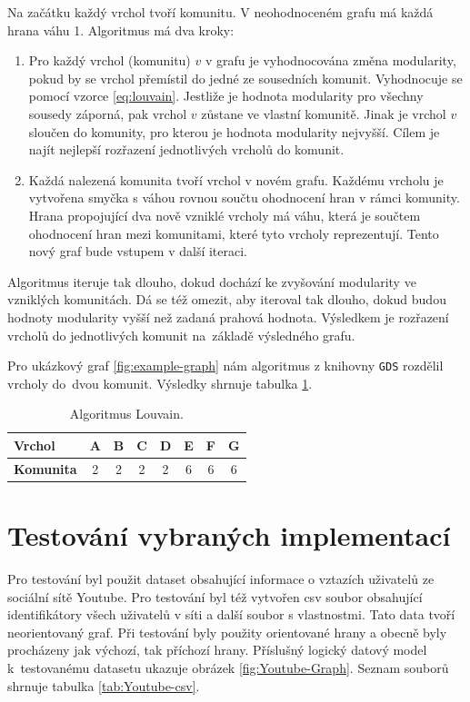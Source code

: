 \documentclass[
  program=infoi,
  biblatex=true,
  figures=true,
  glossaries=false,
  index,
  sourcecodes=true
]{kidiplom}
\begin{document}
Na začátku každý vrchol tvoří komunitu. V neohodnoceném grafu má každá hrana váhu 1. Algoritmus má dva kroky:
\begin{enumerate}
\item Pro každý vrchol (komunitu) $v$ v grafu je vyhodnocována změna modularity, pokud by se vrchol přemístil do jedné ze sousedních komunit. Vyhodnocuje se pomocí vzorce \ref{eq:louvain}. Jestliže je hodnota modularity pro všechny sousedy záporná, pak vrchol $v$ zůstane ve vlastní komunitě. Jinak je vrchol $v$ sloučen do komunity, pro kterou je hodnota modularity nejvyšší. Cílem je najít nejlepší rozřazení jednotlivých vrcholů do komunit.
\item Každá nalezená komunita tvoří vrchol v novém grafu. Každému vrcholu je vytvořena smyčka s váhou rovnou součtu ohodnocení hran v rámci komunity. Hrana propojující dva nově vzniklé vrcholy má váhu, která je součtem ohodnocení hran mezi komunitami, které tyto vrcholy reprezentují. Tento nový graf bude vstupem v další iteraci.
\end{enumerate}
Algoritmus iteruje tak dlouho, dokud dochází ke zvyšování modularity ve vzniklých komunitách. Dá se též omezit, aby iteroval tak dlouho, dokud budou hodnoty modularity vyšší než zadaná prahová hodnota. Výsledkem je rozřazení vrcholů do jednotlivých komunit na~základě výsledného grafu.\cite{louvain}

Pro ukázkový graf \ref{fig:example-graph} nám algoritmus z knihovny \texttt{GDS} rozdělil vrcholy do~dvou komunit. Výsledky shrnuje tabulka \ref{tab:louvain}.

\begin{table}[h]
\begin{center}
\caption{Algoritmus Louvain.}
\label{tab:louvain}
\begin{tabular}{ | l || c | c | c | c | c | c | c | }
 \hline
 \textbf{Vrchol} & A & B & C & D & E & F & G \\
 \hline
 \textbf{Komunita} & 2 & 2 & 2 & 2 & 6 & 6 & 6 \\
 \hline
\end{tabular}
\end{center}
\end{table}
\clearpage
\section{Testování vybraných implementací}
Pro testování byl použit dataset \cite{youtubeDataset} obsahující informace o vztazích uživatelů ze sociální sítě Youtube. Pro testování byl též vytvořen csv soubor obsahující identifikátory všech uživatelů v síti a další soubor s vlastnostmi. Tato data tvoří neorientovaný graf. Při testování byly použity orientované hrany a obecně byly procházeny jak výchozí, tak příchozí hrany. Příslušný logický datový model k~testovanému datasetu ukazuje obrázek \ref{fig:Youtube-Graph}. Seznam souborů shrnuje tabulka \ref{tab:Youtube-csv}.
\end{document}
